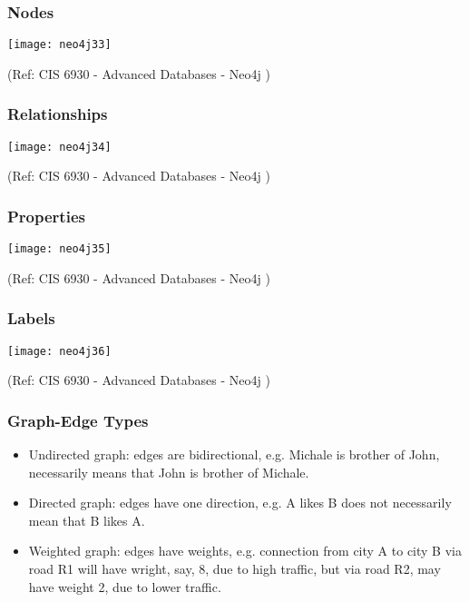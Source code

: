 \begin{frame}\frametitle{Nodes}


\begin{center}
\texttt{[image: neo4j33]}
\end{center}	

{\tiny (Ref: CIS 6930 - Advanced Databases - Neo4j )}
\end{frame}


\begin{frame}\frametitle{Relationships}


\begin{center}
\texttt{[image: neo4j34]}
\end{center}	

{\tiny (Ref: CIS 6930 - Advanced Databases - Neo4j )}
\end{frame}

\begin{frame}\frametitle{Properties}


\begin{center}
\texttt{[image: neo4j35]}
\end{center}	

{\tiny (Ref: CIS 6930 - Advanced Databases - Neo4j )}
\end{frame}


\begin{frame}\frametitle{Labels}


\begin{center}
\texttt{[image: neo4j36]}
\end{center}	

{\tiny (Ref: CIS 6930 - Advanced Databases - Neo4j )}
\end{frame}


\begin{frame}\frametitle{Graph-Edge Types}

\begin{itemize}
\item Undirected graph: edges are bidirectional, e.g. Michale is brother of John, necessarily means that John is brother of Michale.
\item Directed graph: edges have one direction, e.g. A likes B does not necessarily mean that B likes A.
\item Weighted graph: edges have weights, e.g. connection from city A to city B via road R1 will have wright, say, 8, due to high traffic, but via road R2, may have weight 2, due to lower traffic.
\end{itemize}

\end{frame}

